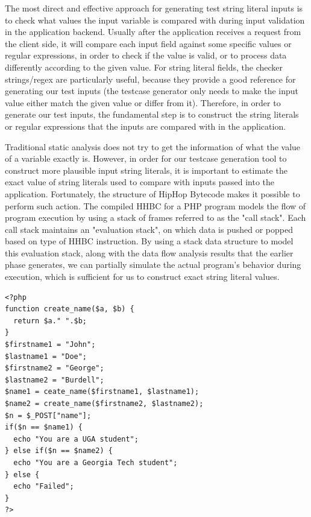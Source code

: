 The most direct and effective approach for generating test string literal inputs is to check what values the input variable is compared with during input validation in the application backend. Usually after the application receives a request from the client side, it will compare each input field against some specific values or regular expressions, in order to check if the value is valid, or to process data differently according to the given value. For string literal fields, the checker strings/regex are particularly useful, because they provide a good reference for generating our test inputs (the testcase generator only needs to make the input value either match the given value or differ from it). Therefore, in order to generate our test inputs, the fundamental step is to construct the string literals or regular expressions that the inputs are compared with in the application.

Traditional static analysis does not try to get the information of what the value of a variable exactly is. However, in order for our testcase generation tool to construct more plausible input string literals, it is important to estimate the exact value of string literals used to compare with inputs passed into the application. Fortunately, the structure of HipHop Bytecode makes it possible to perform such action. The compiled HHBC for a PHP program models the flow of program execution by using a stack of frames referred to as the "call stack". Each call stack maintains an "evaluation stack", on which data is pushed or popped based on type of HHBC instruction. By using a stack data structure to model this evaluation stack, along with the data flow analysis results that the earlier phase generates, we can partially simulate the actual program's behavior during execution, which is sufficient for us to construct exact string literal values.

\lstset{language=PHP}
\begin{minipage}{\textwidth}
\begin{lstlisting}[basicstyle=\small,frame=single]
<?php
function create_name($a, $b) {
  return $a." ".$b;
}
$firstname1 = "John";
$lastname1 = "Doe";
$firstname2 = "George";
$lastname2 = "Burdell";
$name1 = ceate_name($firstname1, $lastname1);
$name2 = create_name($firstname2, $lastname2);
$n = $_POST["name"];
if($n == $name1) {
  echo "You are a UGA student";
} else if($n == $name2) {
  echo "You are a Georgia Tech student";
} else {
  echo "Failed";
}
?>
\end{lstlisting}
\end{minipage}

